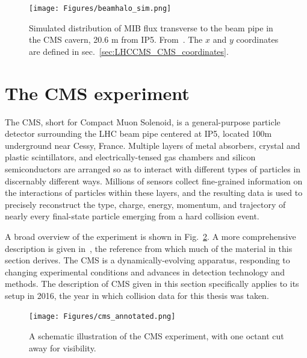 \begin{figure}[hbtp]
  \begin{center}
    \texttt{[image: Figures/beamhalo\_sim.png]}
    \caption{
    Simulated distribution of MIB flux transverse to the beam pipe in the CMS cavern,
    20.6 m from IP5. From~\cite{ref:1748-0221/10/11/P11011}. The $x$ and $y$ coordinates
    are defined in sec.~\ref{sec:LHCCMS_CMS_coordinates}.
    }
    \label{fig:beamhalo_sim}
  \end{center}
\end{figure}

\section{The CMS experiment} \label{sec:LHCCMS_CMS}
The CMS, short for Compact Muon Solenoid, is a general-purpose particle detector surrounding the LHC beam pipe
centered at IP5, located 100\unit{m} underground near Cessy, France. Multiple layers of metal absorbers, crystal and plastic scintillators,
and electrically-tensed gas chambers and silicon semiconductors are arranged so as to interact with different types of particles in discernably different ways.
Millions of sensors collect fine-grained information on the interactions of particles
within these layers, and the resulting data is used to precisely reconstruct the type, charge, energy, momentum, and trajectory
of nearly every final-state particle emerging from a hard collision event.

A broad overview of the experiment is shown in Fig.~\ref{fig:cms_annotated}.
A more comprehensive description is given in~\cite{ref:1748-0221/3/08/S08004}, the reference from which much of the material in this section derives.
The CMS is a dynamically-evolving apparatus, responding to changing experimental conditions and advances in detection technology and methods.
The description of CMS given in this section specifically applies to its setup in 2016, the year in which collision data for this thesis was taken.

\begin{figure}[hbtp]
  \begin{center}
    \texttt{[image: Figures/cms\_annotated.png]}
    \caption{
    A schematic illustration of the CMS experiment, with one octant cut away for visibility.
    }
    \label{fig:cms_annotated}
  \end{center}
\end{figure}

